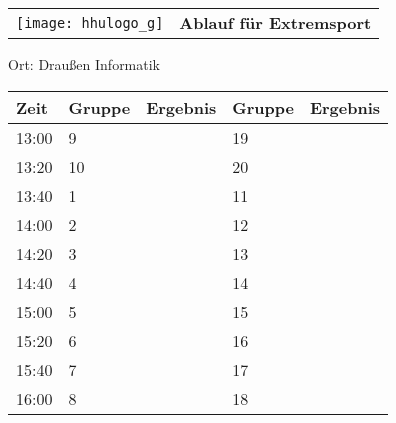\documentclass[a4paper,10pt]{article}
\def\spieli{Extremsport}
\def\raumi{Draußen Informatik}
\begin{document}
   \newpage
  \begin{tabularx}{\textwidth}{lc}
    \texttt{[image: hhulogo\_g]}
  & {\Huge \textbf{Ablauf für \spieli}}
  \end{tabularx}
  \LARGE
  \begin{center}
    \vspace{1cm} 
    Ort: \raumi
  \end{center}
    \vspace{2cm} 
    \begin{tabularx}{\textwidth}{X||X|X||X|X}
	\textbf{Zeit} &\textbf{Gruppe} & \textbf{Ergebnis} &\textbf{Gruppe} & \textbf{Ergebnis}  	\\ \hline \hline
	13:00 &	9	&	&19	&	\\ \hline
	13:20 &	10	&	&20	&	\\ \hline
	13:40 &	1	&	&11	&	\\ \hline

	14:00 &	2	&	&12	&	\\ \hline
	14:20 &	3	&	&13	&	\\ \hline
	14:40 &	4	&	&14	&	\\ \hline

	15:00 &	5	&	&15	&	\\ \hline
	15:20 &	6	&	&16	&	\\ \hline
	15:40 &	7	&	&17	&	\\ \hline

	16:00 &	8	&	&18	&	\\ \hline
      
    \end{tabularx}
   
\end{document}
